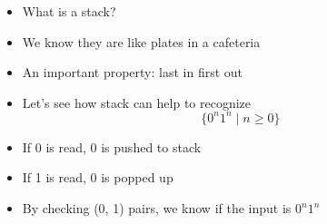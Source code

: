 \begin{frame}[allowframebreaks]
\begin{itemize}
\item What is a stack?

\item [] We know they are like plates in a cafeteria

\item [] An important property: \alert{last in first out}
\item Let's see how stack can help to recognize
  \begin{equation*}
\{0^n 1^n\mid n \geq 0\}
\end{equation*}
\item[] If 0 is read, 0 is pushed to stack
\item If 1 is read, 0 is popped up
\item By checking (0, 1) pairs, we know if the input is
  $0^n 1^n$
\end{itemize}
\end{frame}

